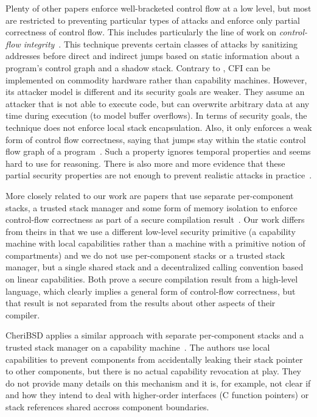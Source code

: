 \documentclass[acmsmall,review,anonymous]{acmart}\settopmatter{printfolios=true,printccs=false,printacmref=false}
\begin{document}
Plenty of other papers enforce well-bracketed control flow at a low level, but most are restricted to preventing particular types of attacks and enforce only partial correctness of control flow.
This includes particularly the line of work on \emph{control-flow integrity}~\citep{abadi_control-flow_2005}.
This technique prevents certain classes of attacks by sanitizing addresses before direct and indirect jumps based on static information about a program's control graph and a shadow stack.
Contrary to \stktokens{}, CFI can be implemented on commodity hardware rather than capability machines.
However, its attacker model is different and its security goals are weaker.
They assume an attacker that is not able to execute code, but can overwrite arbitrary data at any time during execution (to model buffer overflows).
In terms of security goals, the technique does not enforce local stack encapsulation.
Also, it only enforces a weak form of control flow correctness, saying that jumps stay within the static control flow graph of a program~\cite{Abadi2005Theory}.
Such a property ignores temporal properties and seems hard to use for reasoning.
There is also more and more evidence that these partial security properties are not enough to prevent realistic attacks in practice~\citep{Evans:2015:CJW:2810103.2813646,Carlini2015ControlFlowBending}.

More closely related to our work are papers that use separate per-component stacks, a trusted stack manager and some form of memory isolation to enforce control-flow correctness as part of a secure compilation result~\citep{patrignani_modular_2016,juglaret_beyond_2016}.
Our work differs from theirs in that we use a different low-level security primitive (a capability machine with local capabilities rather than a machine with a primitive notion of compartments) and we do not use per-component stacks or a trusted stack manager, but a single shared stack and a decentralized calling convention based on linear capabilities.
Both prove a secure compilation result from a high-level language, which clearly implies a general form of control-flow correctness, but that result is not separated from the results about other aspects of their compiler.

CheriBSD applies a similar approach with separate per-component stacks and a trusted stack manager on a capability machine~\cite{watson_cheri:_2015}.
The authors use local capabilities to prevent components from accidentally leaking their stack pointer to other components, but there is no actual capability revocation at play.
They do not provide many details on this mechanism and it is, for example, not clear if and how they intend to deal with higher-order interfaces (C function pointers) or stack references shared accross component boundaries. 
\end{document}

